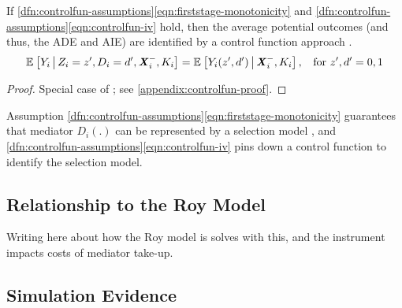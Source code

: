 \begin{theorem}
    \label{thm:controlfun}
    If \ref{dfn:controlfun-assumptions}\eqref{eqn:firststage-monotonicity} and \ref{dfn:controlfun-assumptions}\eqref{eqn:controlfun-iv} hold, then the average potential outcomes (and thus, the ADE and AIE) are identified by a control function approach .
    \[ \mathbb{E}_{} \left[ Y_i \, \middle\vert \, Z_i = z', D_i = d', \boldsymbol{\mathit{X}}_i^-, K_i \right]
        = \mathbb{E}_{} \left[ Y_i(z', d') \, \middle\vert \, \boldsymbol{\mathit{X}}_i^-, K_i \right]
        , \;\; \text{ for } z', d' = 0,1 \]
\end{theorem}
\begin{proof}
    Special case of \citet[Theorem~1]{imbens2009identification}; see \autoref{appendix:controlfun-proof}.
\end{proof}

Assumption \ref{dfn:controlfun-assumptions}\eqref{eqn:firststage-monotonicity} guarantees that mediator $D_i(.)$ can be represented by a selection model \citep{vytlacil2002independence}, and \ref{dfn:controlfun-assumptions}\eqref{eqn:controlfun-iv} pins down a control function to identify the selection model.

\subsection{Relationship to the Roy Model}

Writing here about how the Roy model is solves with this, and the instrument impacts costs of mediator take-up.

\subsection{Simulation Evidence}

